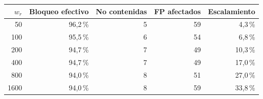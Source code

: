\begin{tabular}{rrrrr}
\toprule
$w_r$ & Bloqueo efectivo & No contenidas & FP afectados & Escalamiento \\
\midrule
50 & 96,2\,\% & 5 & 59 & 4,3\,\% \\
100 & 95,5\,\% & 6 & 54 & 6,8\,\% \\
200 & 94,7\,\% & 7 & 49 & 10,3\,\% \\
400 & 94,7\,\% & 7 & 49 & 17,0\,\% \\
800 & 94,0\,\% & 8 & 51 & 27,0\,\% \\
1600 & 94,0\,\% & 8 & 59 & 33,8\,\% \\
\bottomrule
\end{tabular}
